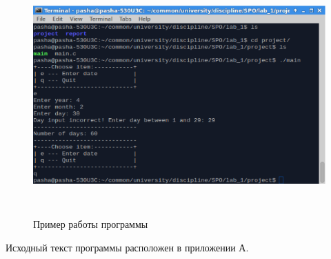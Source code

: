 \begin{figure}[htbp]
  \centering
  \includegraphics[width=150mm,height=92mm]{img/image1}
  \caption{Пример работы программы}\label{fig:image1}
\end{figure}

Исходный текст программы расположен в приложении А.

\newpage